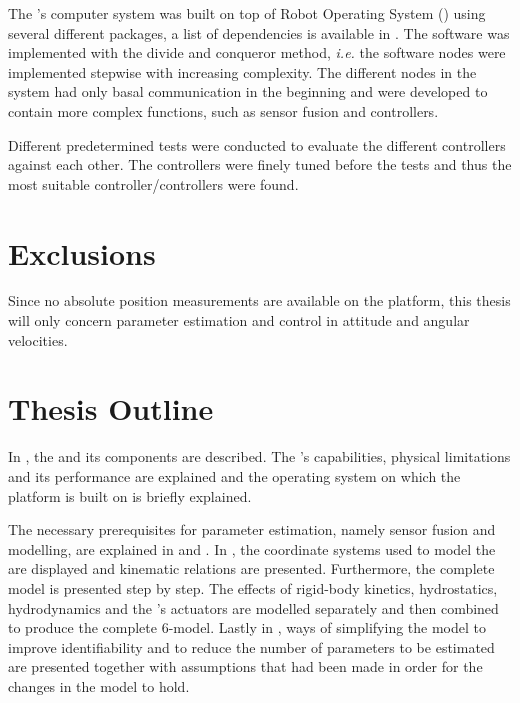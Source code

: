 The \abbrROV's computer system was built on top of Robot Operating System (\abbrROS) using several different packages, a list of dependencies is available in . The software was implemented with the divide and conqueror method, \textit{i.e.} the software nodes were implemented stepwise with increasing complexity. The different nodes in the system had only basal communication in the beginning and were developed to contain more complex functions, such as sensor fusion and controllers. 

Different predetermined tests were conducted to evaluate the different controllers against each other. The controllers were finely tuned before the tests and thus the most suitable controller/controllers were found.


\section{Exclusions}
Since no absolute position measurements are available on the \abbrROV platform, this thesis will only concern parameter estimation and control in attitude and angular velocities.%
\section{Thesis Outline}
In , the \abbrROV and its components are described. The \abbrROV's capabilities, physical limitations and its performance are explained and the operating system on which the \abbrROV platform is built on is briefly explained.

The necessary prerequisites for parameter estimation, namely sensor fusion and modelling, are explained in  and . In , the coordinate systems used to model the \abbrROV are displayed and kinematic relations are presented. Furthermore, the complete \abbrROV model is presented step by step. The effects of rigid-body kinetics, hydrostatics, hydrodynamics and the \abbrROV's actuators are modelled separately and then combined to produce the complete 6-\abbrDOF model. 
Lastly in , ways of simplifying the model to improve identifiability and to reduce the number of parameters to be estimated are presented together with assumptions that had been made in order for the changes in the model to hold. 

